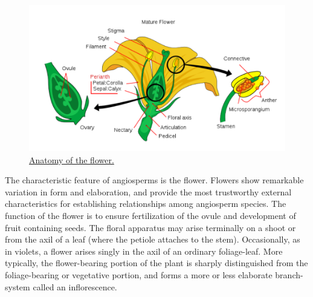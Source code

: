 \begin{figure}

{\centering \includegraphics[width=0.7\linewidth]{./figures/plants/mature_flower} 

}

\caption{\href{https://commons.wikimedia.org/wiki/File:Mature_flower_diagram.svg}{Anatomy of the flower.}}\label{fig:flower}
\end{figure}

The characteristic feature of angiosperms is the flower. Flowers show remarkable variation in form and elaboration, and provide the most trustworthy external characteristics for establishing relationships among angiosperm species. The function of the flower is to ensure fertilization of the ovule and development of fruit containing seeds. The floral apparatus may arise terminally on a shoot or from the axil of a leaf (where the petiole attaches to the stem). Occasionally, as in violets, a flower arises singly in the axil of an ordinary foliage-leaf. More typically, the flower-bearing portion of the plant is sharply distinguished from the foliage-bearing or vegetative portion, and forms a more or less elaborate branch-system called an inflorescence.




